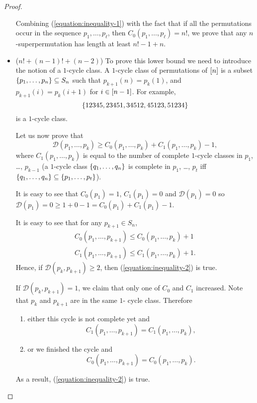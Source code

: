 \begin{proof}
\begin{itemize}
      Combining (\ref{equation:inequality-1}) with the fact that if all the
      permutations occur in the sequence $p_1, \dots, p_\ell$, then
      $C_0(p_1, \dots, p_\ell) = n!$,
      we prove that any $n$-superpermutation has length at least $n! - 1 + n$.
    \item ($n! + (n - 1)! + (n - 2)$)
      To prove this lower bound we need to introduce the notion of a $1$-cycle
      class. A $1$-cycle class of permutations of ${[{n}]}$ is a
      subset $\set{p_1, \dots, p_n} \subseteq S_n$ such that $p_{k + 1}(n) =
      p_k(1)$, and $p_{k + 1}(i) = p_k(i + 1)$ for $i \in {[{n - 1}]}$. For
      example,
      \[
        \set{12345, 23451, 34512, 45123, 51234}
      \]
      is a $1$-cycle class.

      Let us now prove that
      \begin{equation}
        \label{equation:inequality-2}
        \mathcal{D}(p_1, \dots, p_k) \ge
        C_0(p_1, \dots, p_k) + C_1(p_1, \dots, p_k) - 1,
      \end{equation}
      where $C_1(p_1, \dots, p_k)$ is equal to the number of complete $1$-cycle
      classes in $p_1$, \dots, $p_{k - 1}$ (a $1$-cycle class
      $\set{q_1, \dots, q_n}$ is complete in $p_1$, \dots, $p_t$ iff
      $\set{q_1, \dots, q_n} \subseteq \set{p_1, \dots, p_t}$).

      It is easy to see that $C_0(p_1) = 1$, $C_1(p_1) = 0$ and
      $\mathcal{D}(p_1) = 0$ so
      $\mathcal{D}(p_1) = 0 \ge 1 + 0 - 1 = C_0(p_1) + C_1(p_1) - 1$.

      It is easy to see that for any $p_{k + 1} \in S_n$,
      \begin{gather*}
        C_0(p_1, \dots, p_{k + 1}) \le C_0(p_1, \dots, p_k) + 1  \\
        C_1(p_1, \dots, p_{k + 1}) \le C_1(p_1, \dots, p_k) + 1.
      \end{gather*}
      Hence, if $\mathcal{D}(p_k, p_{k + 1}) \ge 2$, then
      (\ref{equation:inequality-2}) is true.

      If $\mathcal{D}(p_k, p_{k + 1}) = 1$, we claim that only one of $C_0$ and
      $C_1$ increased. Note that $p_k$ and $p_{k + 1}$ are in the same $1$-
      cycle class. Therefore
      \begin{enumerate}
        \item either this cycle is not complete yet and
          \[
            C_1(p_1, \dots, p_{k + 1}) = C_1(p_1, \dots, p_k),
          \]
        \item or we finished the cycle and
          \[
            C_0(p_1, \dots, p_{k + 1}) = C_0(p_1, \dots, p_k).
          \]
      \end{enumerate}
      As a result, (\ref{equation:inequality-2}) is true.


\end{itemize}
\end{proof}
